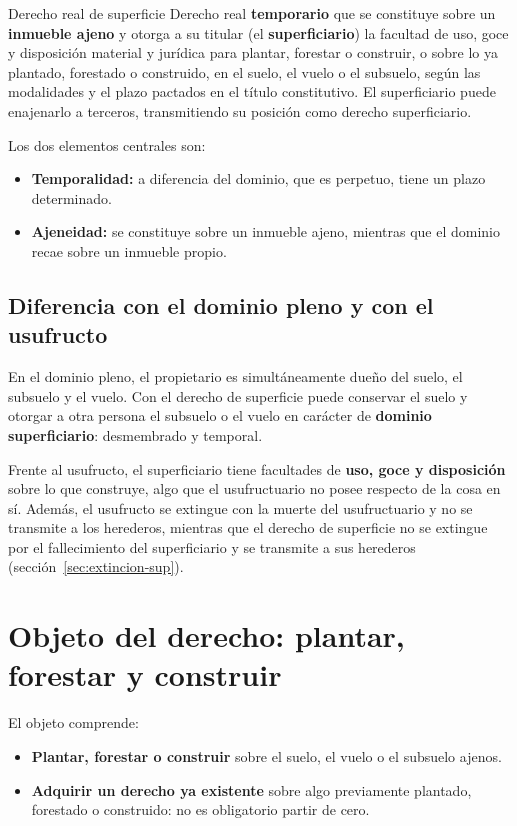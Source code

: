 \documentclass[12pt,oneside]{book}
\begin{document}
\begin{definition}{Derecho real de superficie}
Derecho real \textbf{temporario} que se constituye sobre un \textbf{inmueble ajeno} y otorga a su titular (el \textbf{superficiario}) la facultad de uso, goce y disposición material y jurídica para plantar, forestar o construir, o sobre lo ya plantado, forestado o construido, en el suelo, el vuelo o el subsuelo, según las modalidades y el plazo pactados en el título constitutivo. El superficiario puede enajenarlo a terceros, transmitiendo su posición como derecho superficiario.
\end{definition}

Los dos elementos centrales son:

\begin{itemize}
    \item \textbf{Temporalidad:} a diferencia del dominio, que es perpetuo, tiene un plazo determinado.
    \item \textbf{Ajeneidad:} se constituye sobre un inmueble ajeno, mientras que el dominio recae sobre un inmueble propio.
\end{itemize}

\subsection{Diferencia con el dominio pleno y con el usufructo}

En el dominio pleno, el propietario es simultáneamente dueño del suelo, el subsuelo y el vuelo. Con el derecho de superficie puede conservar el suelo y otorgar a otra persona el subsuelo o el vuelo en carácter de \textbf{dominio superficiario}: desmembrado y temporal.

Frente al usufructo, el superficiario tiene facultades de \textbf{uso, goce y disposición} sobre lo que construye, algo que el usufructuario no posee respecto de la cosa en sí. Además, el usufructo se extingue con la muerte del usufructuario y no se transmite a los herederos, mientras que el derecho de superficie no se extingue por el fallecimiento del superficiario y se transmite a sus herederos (sección~\ref{sec:extincion-sup}).

\section{Objeto del derecho: plantar, forestar y construir}

El objeto comprende:

\begin{itemize}
    \item \textbf{Plantar, forestar o construir} sobre el suelo, el vuelo o el subsuelo ajenos.
    \item \textbf{Adquirir un derecho ya existente} sobre algo previamente plantado, forestado o construido: no es obligatorio partir de cero.
\end{itemize}
\end{document}
